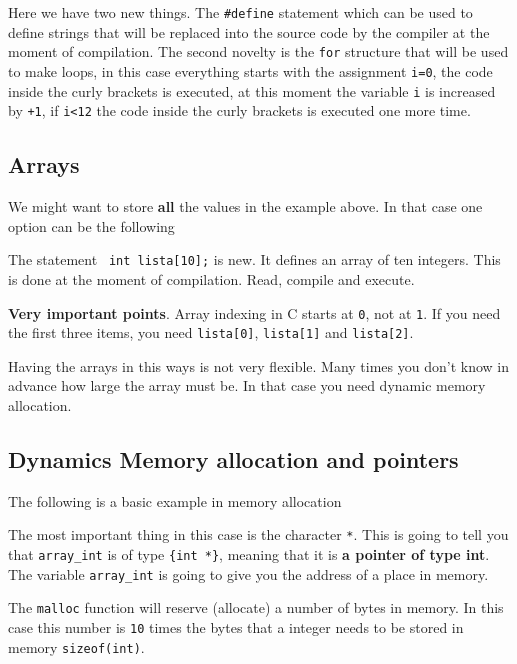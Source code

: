 \documentclass{article}
\begin{document}


Here we have two new things. The \verb"#define" statement which can be used to define strings that will be replaced into the source code by the compiler at the moment of compilation. The second novelty is the \verb"for" structure that will be used to make loops, in this case everything starts with the assignment \verb"i=0", the code inside the curly brackets is executed, at this moment the variable \verb"i" is increased by \verb"+1", if \verb"i<12" the code inside the curly brackets is executed one more time.

\subsection{Arrays}

We might want to store {\bf all} the values in the example above. In that case one option can be the following



The statement \verb" int lista[10];" is new. It defines an array of ten integers. This is done at the moment of compilation. Read, compile and execute. 

{\bf Very important points}. Array indexing in C starts at \verb"0", not at \verb"1". If you need the first three items, you need \verb"lista[0]", \verb"lista[1]" and \verb"lista[2]".

Having the arrays in this ways is not very flexible. Many times you don't know in advance how large the array must be. In that case you need dynamic memory allocation.


\subsection{Dynamics Memory allocation and pointers}
The following is a basic example in memory allocation



The most important thing in this case is the character \verb"*". This is going to tell you that \verb"array_int" is of type \verb"{int *}", meaning that it is {\bf a pointer of type int}. The variable \verb"array_int" is going to give you the address of a place in memory.

The \verb"malloc" function will reserve (allocate) a number of bytes in memory. In this case this number is \verb"10" times the bytes that a integer needs to be stored in memory \verb"sizeof(int)". 
\end{document}
